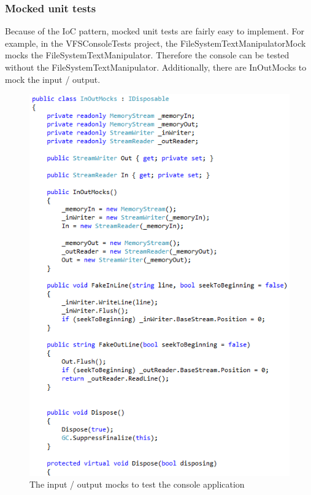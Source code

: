 \documentclass[JCDReport.tex]{subfiles}
\begin{document}
\subsubsection{Mocked unit tests}
Because of the IoC pattern, mocked unit tests are fairly easy to implement. For example, in the VFSConsoleTests project, the FileSystemTextManipulatorMock mocks the FileSystemTextManipulator. Therefore the console can be tested without the FileSystemTextManipulator. Additionally, there are InOutMocks to mock the input / output.
\begin{figure}[h!]
	\centering
	\includegraphics[scale=1]{imageslukas/inoutmocks.png} 
	\caption{The input / output mocks to test the console application}
\end{figure}

\end{document}
